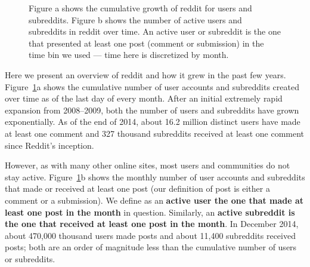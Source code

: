 \begin{figure}[!tb]
\caption{Figure a shows the cumulative growth of reddit for users and subreddits. Figure b shows the number of active users and subreddits in reddit over time. An active user or subreddit is the one that presented at least one post (comment or submission) in the time bin we used --- time here is discretized by month.}
\label{fig:cumulative}
\end{figure}

Here we present an overview of reddit and how it grew in the past few years. Figure~\ref{fig:cumulative}a shows the cumulative number of user accounts and subreddits created over time as of the last day of every month. After an initial extremely rapid expansion from 2008--2009, both the number of users and subreddits have grown exponentially.  As of the end of 2014, about 16.2 million distinct users have made at least one comment and 327 thousand subreddits received at least one comment since Reddit's inception.

However, as with many other online sites, most users \cite{} and communities \cite{butler_kraut_paper} do not stay active. Figure~\ref{fig:cumulative}b shows the monthly number of user accounts and subreddits that made or received at least one post (our definition of post is either a comment or a submission). We define as an \textbf{active user the one that made at least one post in the month} in question. Similarly, an \textbf{active subreddit is the one that received at least one post in the month}. In December 2014, about 470,000 thousand users made posts and about 11,400 subreddits received posts; both are an order of magnitude less than the cumulative number of users or subreddits.  



